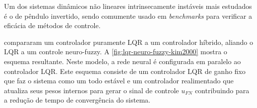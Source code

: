 Um dos sistemas dinâmicos não lineares intrinsecamente instáveis mais estudados é o de pêndulo invertido, sendo comumente usado em \textit{benchmarks} para verificar a eficácia de métodos de controle. 

{} compararam um controlador puramente LQR a um controlador híbrido, aliando o LQR a um controle neuro-fuzzy. A \autoref{fig:lqr-neuro-fuzzy-kim2000} mostra o esquema resultante. Neste modelo, a rede neural é configurada em paralelo ao controlador LQR. Este esquema consiste de um controlador LQR de ganho fixo que faz o sistema como um todo estável e um controlador realimentado que atualiza seus pesos internos para gerar o sinal de controle $u_{FN}$ contribuindo para a redução de tempo de convergência do sistema.

